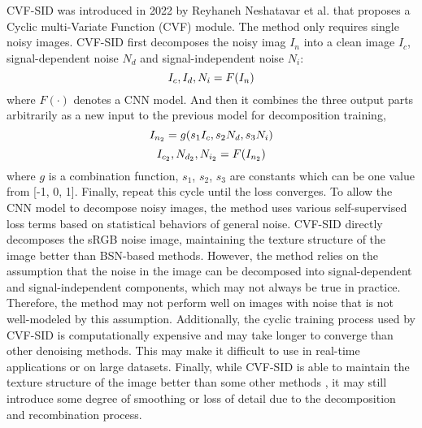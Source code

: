 \documentclass[conference]{IEEEtran}
\begin{document}
CVF-SID\cite{neshatavar2022cvf} was introduced in 2022 by Reyhaneh Neshatavar et al. that proposes a Cyclic multi-Variate Function (CVF) module. The method only requires single noisy images. CVF-SID first decomposes the noisy imag  $I_n$ into a clean image $I_c$, signal-dependent noise $N_d$ and signal-independent noise $N_i$: 
\begin{equation}
	\setlength{\abovedisplayskip}{0pt}
	\setlength{\belowdisplayskip}{0pt}
	I_c,I_d,N_i = F(I_n)
	\label{eq:CVF_1}
\end{equation}
where $F(\cdot)$ denotes a CNN model. And then it combines the three output parts arbitrarily as a new input to the previous model for decomposition training,
\begin{equation}
	\setlength{\abovedisplayskip}{0pt}
	\setlength{\belowdisplayskip}{0pt}
	I_{n_2} = g(s_1I_c, s_2N_d, s_3N_i)
	\label{eq:CVF_2}
\end{equation}
\begin{equation}
	\setlength{\abovedisplayskip}{0pt}
	\setlength{\belowdisplayskip}{0pt}
	I_{c_2}, N_{d_2}, N_{i_2}=F(I_{n_2})
	\label{eq:CVF_3}
\end{equation}
where $g$ is a combination function, $s_1$, $s_2$, $s_3$  are constants which can be one value from [-1, 0, 1]. Finally, repeat this cycle until the loss converges.
To allow the CNN model to decompose noisy images, the method uses various self-supervised loss terms based on statistical behaviors of general noise. 
CVF-SID directly decomposes the sRGB noise image, maintaining the texture structure of the image better than BSN-based methods.
However, the method relies on the assumption that the noise in the image can be decomposed into signal-dependent and signal-independent components, which may not always be true in practice. Therefore, the method may not perform well on images with noise that is not well-modeled by this assumption. Additionally, the cyclic training process used by CVF-SID is computationally expensive and may take longer to converge than other denoising methods. This may make it difficult to use in real-time applications or on large datasets. Finally, while CVF-SID is able to maintain the texture structure of the image better than some other methods \cite{krull2019noise2void, batson2019noise2self, pang2021recorrupted}, it may still introduce some degree of smoothing or loss of detail due to the decomposition and recombination process.
\end{document}
